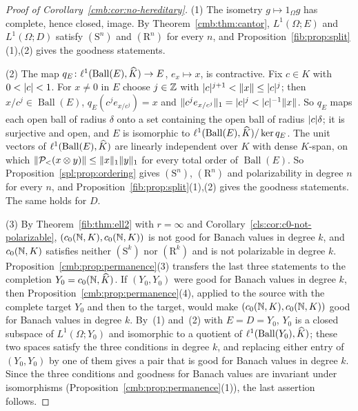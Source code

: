 \begin{proof}[Proof of Corollary~\ref{cmb:cor:no-hereditary}]
(1) The isometry $g\mapsto1_\Omega g$ has complete, hence closed, image. By Theorem~\ref{cmb:thm:cantor},
$L^1(\Omega;E)$ and $L^1(\Omega;D)$ satisfy $(\mathrm S^n)$ and $(\mathrm R^n)$ for every $n$, and
Proposition~\ref{fib:prop:split}(1),(2) gives the goodness statements.

(2) The map $q_E\colon\ell^1(\operatorname{Ball}(E),\widehat K)\to E$, $e_x\mapsto x$, is contractive. Fix $c\in K$ with
$0<\lvert c\rvert<1$. For $x\ne0$ in $E$ choose $j\in\mathbb Z$ with $\lvert c\rvert^{j+1}<\lVert x\rVert\le\lvert c\rvert^j$; then $x/c^j\in\operatorname{Ball}(E)$,
$q_E(c^je_{x/c^j})=x$ and $\lVert c^je_{x/c^j}\rVert_1=\lvert c\rvert^j<\lvert c\rvert^{-1}\lVert x\rVert$. So $q_E$ maps each open ball of radius
$\delta$ onto a set containing the open ball of radius $\lvert c\rvert\delta$; it is surjective and open, and $E$ is isomorphic to
$\ell^1(\operatorname{Ball}(E),\widehat K)/\ker q_E$. The unit vectors of $\ell^1(\operatorname{Ball}(E),\widehat K)$ are linearly
independent over $K$ with dense $K$-span, on which $\lVert \mathcal P_<(x\otimes y)\rVert\le\lVert x\rVert_1\lVert y\rVert_1$ for every total order
of $\operatorname{Ball}(E)$. So Proposition~\ref{spl:prop:ordering} gives $(\mathrm S^n)$, $(\mathrm R^n)$ and
polarizability in degree $n$ for every $n$, and Proposition~\ref{fib:prop:split}(1),(2) gives the goodness statements.
The same holds for $D$.

(3) By Theorem~\ref{fib:thm:ell2} with $r=\infty$ and Corollary~\ref{cls:cor:c0-not-polarizable},
$(c_0(\mathbb N,K),c_0(\mathbb N,K))$ is not good for Banach values in degree $k$, and $c_0(\mathbb N,K)$ satisfies neither $(\mathrm S^k)$ nor
$(\mathrm R^k)$ and is not polarizable in degree $k$. Proposition~\ref{cmb:prop:permanence}(3) transfers the last three
statements to the completion $Y_0=c_0(\mathbb N,\widehat K)$. If $(Y_0,Y_0)$ were good for Banach values in degree $k$, then
Proposition~\ref{cmb:prop:permanence}(4), applied to the source with the complete target $Y_0$ and then to the target,
would make $(c_0(\mathbb N,K),c_0(\mathbb N,K))$ good for Banach values in degree $k$. By~(1) and~(2) with $E=D=Y_0$, $Y_0$ is a closed
subspace of $L^1(\Omega;Y_0)$ and isomorphic to a quotient of $\ell^1(\operatorname{Ball}(Y_0),\widehat K)$; these two spaces
satisfy the three conditions in degree $k$, and replacing either entry of $(Y_0,Y_0)$ by one of them gives a pair that is
good for Banach values in degree $k$. Since the three conditions and goodness for Banach values are invariant under
isomorphisms (Proposition~\ref{cmb:prop:permanence}(1)), the last assertion follows.
\end{proof}
